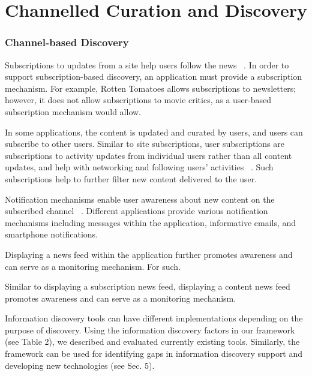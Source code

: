 {\section{Channelled Curation and Discovery}

{\subsubsection{Channel-based Discovery}

Subscriptions to updates from a site help users follow the news ~\cite{java}. In order to support subscription-based discovery, an application must provide a subscription mechanism. For example, Rotten Tomatoes allows subscriptions to newsletters; however, it does not allow subscriptions to movie critics, as a user-based subscription mechanism would allow. 

In some applications, the content is updated and curated by users, and users can subscribe to other users. Similar to site subscriptions, user subscriptions are subscriptions to activity updates from individual users rather than all content updates, and help with networking and following users' activities ~\cite{millen}. Such subscriptions help to further filter new content delivered to the user. 

Notification mechanisms enable user awareness about new content on the subscribed channel ~\cite{millen}. Different applications provide various notification mechanisms including messages within the application, informative emails, and smartphone notifications.

Displaying a news feed within the application further promotes awareness and can serve as a monitoring mechanism. For such. 

Similar to displaying a subscription news feed, displaying a content news feed promotes awareness and can serve as a monitoring mechanism.

Information discovery tools can have different implementations depending on the purpose of discovery. Using the information discovery factors in our framework (see Table 2), we described and evaluated currently existing tools. Similarly, the framework can be used for identifying gaps in information discovery support and developing new technologies (see Sec. 5).   \\

} %

}
